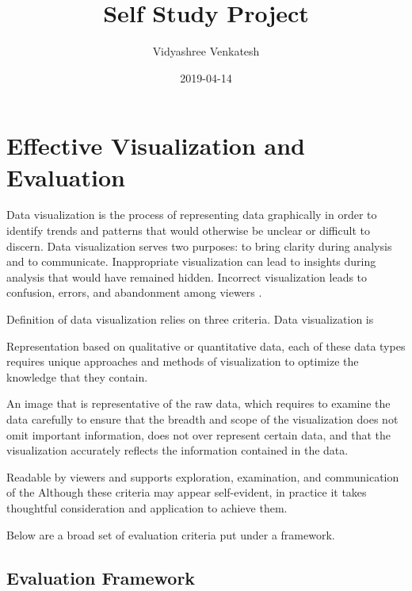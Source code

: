 \documentclass[]{book}
\title{Self Study Project}
\author{Vidyashree Venkatesh}
\date{2019-04-14}
\begin{document}
\maketitle

{
\setcounter{tocdepth}{1}
\tableofcontents
}
\hypertarget{effective-visualization-and-evaluation}{%
\chapter{Effective Visualization and Evaluation}\label{effective-visualization-and-evaluation}}

Data visualization is the process of representing data graphically in order to identify trends and patterns that would otherwise be unclear or difficult to discern. Data visualization serves two purposes: to bring clarity during analysis and to communicate. Inappropriate visualization can lead to insights during analysis that would have remained hidden. Incorrect visualization leads to confusion, errors, and abandonment among viewers \citep{Intro}.

Definition of data visualization relies on three criteria. Data visualization is

Representation based on qualitative or quantitative data, each of these data types requires unique approaches and methods of visualization to optimize the knowledge that they contain.

An image that is representative of the raw data, which requires to examine the data carefully to ensure that the breadth and scope of the visualization does not omit important information, does not over represent certain data, and that the visualization accurately reflects the information contained in the data.

Readable by viewers and supports exploration, examination, and communication of the
Although these criteria may appear self-evident, in practice it takes thoughtful consideration and application to achieve them.
\citep{visualization_eval}

Below are a broad set of evaluation criteria put under a framework.

\hypertarget{evaluation-framework}{%
\section{Evaluation Framework}\label{evaluation-framework}}

\citep{Eval_Viz}
\end{document}
